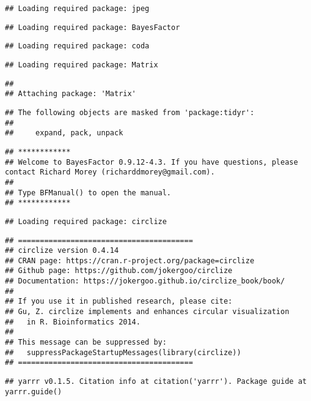 \documentclass[
]{article}
\begin{document}
\begin{verbatim}
## Loading required package: jpeg
\end{verbatim}

\begin{verbatim}
## Loading required package: BayesFactor
\end{verbatim}

\begin{verbatim}
## Loading required package: coda
\end{verbatim}

\begin{verbatim}
## Loading required package: Matrix
\end{verbatim}

\begin{verbatim}
## 
## Attaching package: 'Matrix'
\end{verbatim}

\begin{verbatim}
## The following objects are masked from 'package:tidyr':
## 
##     expand, pack, unpack
\end{verbatim}

\begin{verbatim}
## ************
## Welcome to BayesFactor 0.9.12-4.3. If you have questions, please contact Richard Morey (richarddmorey@gmail.com).
## 
## Type BFManual() to open the manual.
## ************
\end{verbatim}

\begin{verbatim}
## Loading required package: circlize
\end{verbatim}

\begin{verbatim}
## ========================================
## circlize version 0.4.14
## CRAN page: https://cran.r-project.org/package=circlize
## Github page: https://github.com/jokergoo/circlize
## Documentation: https://jokergoo.github.io/circlize_book/book/
## 
## If you use it in published research, please cite:
## Gu, Z. circlize implements and enhances circular visualization
##   in R. Bioinformatics 2014.
## 
## This message can be suppressed by:
##   suppressPackageStartupMessages(library(circlize))
## ========================================
\end{verbatim}

\begin{verbatim}
## yarrr v0.1.5. Citation info at citation('yarrr'). Package guide at yarrr.guide()
\end{verbatim}
\end{document}
